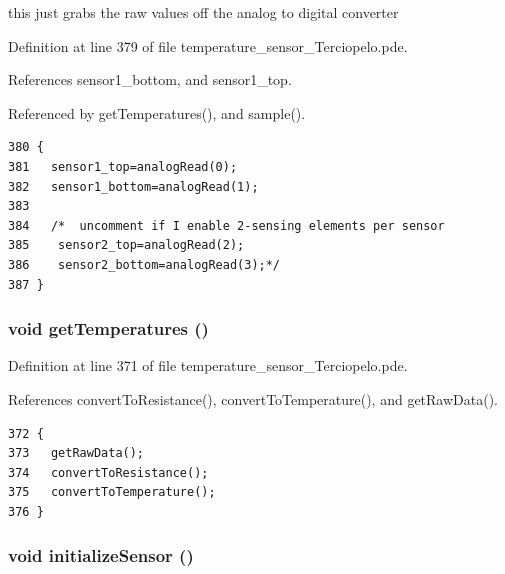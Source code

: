 this just grabs the raw values off the analog to digital converter 



Definition at line 379 of file temperature\_\-sensor\_\-Terciopelo.pde.

References sensor1\_\-bottom, and sensor1\_\-top.

Referenced by getTemperatures(), and sample().

\begin{Code}\begin{verbatim}380 {
381   sensor1_top=analogRead(0);
382   sensor1_bottom=analogRead(1);
383 
384   /*  uncomment if I enable 2-sensing elements per sensor
385    sensor2_top=analogRead(2);
386    sensor2_bottom=analogRead(3);*/
387 }
\end{verbatim}
\end{Code}


\hypertarget{temperature__sensor___terciopelo_8pde_ea28af0c7128421a38589128bb39ef1c}{
\subsubsection[{getTemperatures}]{\setlength{\rightskip}{0pt plus 5cm}void getTemperatures ()}}
\label{temperature__sensor___terciopelo_8pde_ea28af0c7128421a38589128bb39ef1c}




Definition at line 371 of file temperature\_\-sensor\_\-Terciopelo.pde.

References convertToResistance(), convertToTemperature(), and getRawData().

\begin{Code}\begin{verbatim}372 {
373   getRawData();
374   convertToResistance();
375   convertToTemperature();
376 }
\end{verbatim}
\end{Code}


\hypertarget{temperature__sensor___terciopelo_8pde_f6c9587ccbcf223f8c79f508c2fef366}{
\subsubsection[{initializeSensor}]{\setlength{\rightskip}{0pt plus 5cm}void initializeSensor ()}}
\label{temperature__sensor___terciopelo_8pde_f6c9587ccbcf223f8c79f508c2fef366}


